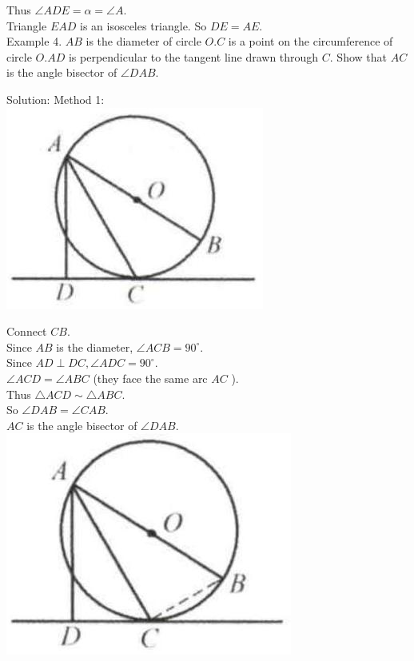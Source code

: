 \documentclass[10pt]{article}
\begin{document}
Thus \(\angle A D E=\alpha=\angle A\).\\
Triangle \(E A D\) is an isosceles triangle. So \(D E=A E\).\\
Example 4. \(A B\) is the diameter of circle \(O . C\) is a point on the circumference of circle \(O . A D\) is perpendicular to the tangent line drawn through \(C\). Show that \(A C\) is the angle bisector of \(\angle D A B\).

Solution:
Method 1:\\
\includegraphics[max width=\textwidth, center]{2025_04_17_97bc1f7e44d93c271a88g-164(1)}

Connect \(C B\).\\
Since \(A B\) is the diameter, \(\angle A C B=90^{\circ}\).\\
Since \(A D \perp D C, \angle A D C=90^{\circ}\).\\
\(\angle A C D=\angle A B C\) (they face the same arc \(A C\) ).\\
Thus \(\triangle A C D \sim \triangle A B C\).\\
So \(\angle D A B=\angle C A B\).\\
\(A C\) is the angle bisector of \(\angle D A B\).\\
\includegraphics[max width=\textwidth, center]{2025_04_17_97bc1f7e44d93c271a88g-164(2)}
\end{document}
